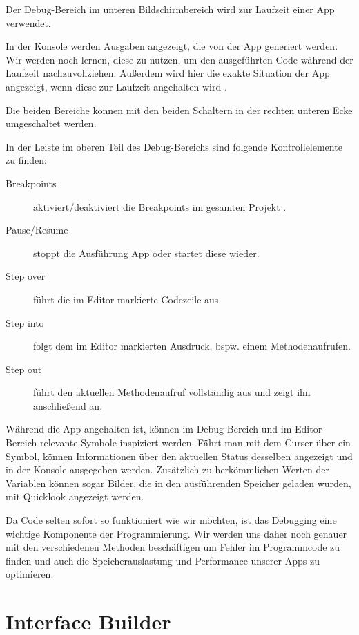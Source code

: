 \documentclass[parskip=half, final]{scrreprt}
\begin{document}
Der Debug-Bereich im unteren Bildschirmbereich wird zur Laufzeit einer App verwendet.

In der Konsole werden Ausgaben angezeigt, die von der App generiert werden. Wir werden noch lernen, diese zu nutzen, um den ausgeführten Code während der Laufzeit nachzuvollziehen. Außerdem wird hier die exakte Situation der App angezeigt, wenn diese zur Laufzeit angehalten wird .


Die beiden Bereiche können mit den beiden Schaltern in der rechten unteren Ecke umgeschaltet werden.

In der Leiste im oberen Teil des Debug-Bereichs sind folgende Kontrollelemente zu finden:
\begin{description}
\item[Breakpoints] aktiviert/deaktiviert die Breakpoints im gesamten Projekt .
\item[Pause/Resume] stoppt die Ausführung App oder startet diese wieder.
\item[Step over] führt die im Editor markierte Codezeile aus.
\item[Step into] folgt dem im Editor markierten Ausdruck, bspw. einem Methodenaufrufen.
\item[Step out] führt den aktuellen Methodenaufruf vollständig aus und zeigt ihn anschließend an.
\end{description}

Während die App angehalten ist, können im Debug-Bereich und im Editor-Bereich relevante Symbole inspiziert werden. Fährt man mit dem Curser über ein Symbol, können Informationen über den aktuellen Status desselben angezeigt und in der Konsole ausgegeben werden. Zusätzlich zu herkömmlichen Werten der Variablen können sogar Bilder, die in den ausführenden Speicher geladen wurden, mit Quicklook angezeigt werden.

Da Code selten sofort so funktioniert wie wir möchten, ist das Debugging eine wichtige Komponente der Programmierung. Wir werden uns daher noch genauer mit den verschiedenen Methoden beschäftigen um Fehler im Programmcode zu finden und auch die Speicherauslastung und Performance unserer Apps zu optimieren.

\section{Interface Builder}\label{sec:ib}
\end{document}
